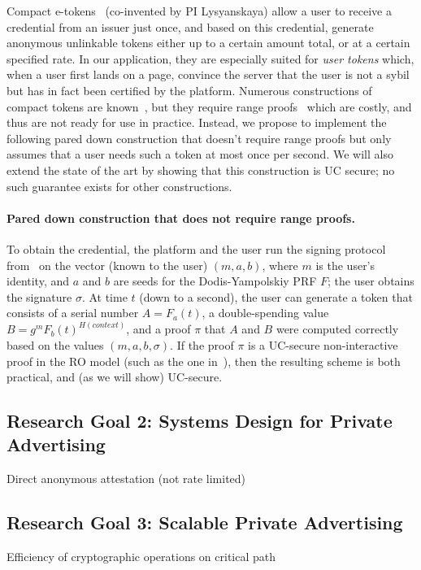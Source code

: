 Compact e-tokens~\cite{EC:camhohlys05,CCS:chklm06} (co-invented by PI Lysyanskaya) allow a user to receive a credential from an issuer just once, and based on this credential, generate anonymous unlinkable tokens either up to a certain amount total, or at a certain specified rate.  In our application, they are especially suited for \emph{user tokens} which, when a user first lands on a page, convince the server that the user is not a sybil but has in fact been certified by the platform.  Numerous constructions of compact tokens are known~\cite{EC:camhohlys05,CCS:chklm06,bckl09}, but they require range proofs~\cite{AC:CamChaShe08} which are costly, and thus are not ready for use in practice.  Instead, we propose to implement the following pared down construction that doesn't require range proofs but only assumes that a user needs such a token at most once per second.  We will also extend the state of the art by showing that this construction is UC secure; no such guarantee exists for other constructions.

\paragraph{Pared down construction that does not require range proofs.} To obtain the credential, the platform and the user run the signing protocol from~\cite{C:CamLys04} on the vector (known to the user) $(m,a,b)$, where $m$ is the user's identity, and $a$ and $b$ are seeds for the Dodis-Yampolskiy PRF $F$; the user obtains the signature $\sigma$.  At time $t$ (down to a second), the user can generate a token that consists of a serial number $A=F_a(t)$, a double-spending value $B = g^m F_b(t)^{H(\mathit{context})}$, and a proof $\pi$ that $A$ and $B$ were computed correctly based on the values $(m,a,b,\sigma)$. If the proof $\pi$ is a UC-secure non-interactive proof in the RO model (such as the one in~\cite{lysros22}), then the resulting scheme is both practical, and (as we will show) UC-secure.

\subsection{Research Goal 2: Systems Design for Private Advertising}

Direct anonymous attestation (not rate limited)

\subsection{Research Goal 3: Scalable Private Advertising}

Efficiency of cryptographic operations on critical path

